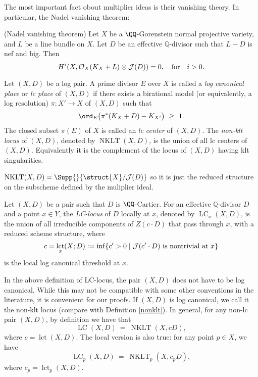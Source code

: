 \documentclass[12pt]{article}
\theoremstyle{plain}
\DeclareMathOperator{\NKLT}{NKLT}
\DeclareMathOperator{\LC}{LC}
\DeclareMathOperator{\lct}{lct}
\newcommand{\mb}[1]{\mathbb{#1}}
\begin{document}
The most important fact obout multiplier ideas is their vanishing theory. In particular, the Nadel vanishing theorem:

\begin{theorem}\label{nadel} \textup{(Nadel vanishing theorem)}
Let $X$ be a $\QQ$-Gorenstein normal projective variety, and $L$ be a line bundle on $X$. Let $D$ be an effective $\mb{Q}$-divisor such that $L-D$ is nef and big. Then
\[ H^i(X,\mathcal{O}_X(K_X+L)\otimes \mathcal{J}(D))=0,\quad \textup{for}\quad i>0. \]
\end{theorem}

\begin{defn}\label{nonklt}\textup{
    Let $(X,D)$ be a log pair. A prime divisor $E$ over $X$ is called a \emph{log canonical place} or \textit{lc place} of $(X,D)$ if there exists a birational model (or equivalently, a log resolution) $\pi:X'\rightarrow X$ of $(X,D)$ such that
    \[ \ord_{E}\big(\pi^{*}(K_X+D)-K_{X'}\big)\ \ge \ 1. \]
The closed subset $\pi(E)$ of $X$ is called an \emph{lc center} of $(X,D)$. The \emph{non-klt locus} of $(X,D)$, denoted by $\NKLT(X,D)$, is the union of all lc centers of $(X,D)$. Equivalently it is the complement of the locus of $(X, D)$ having klt singularities.
}\end{defn}

\begin{rmk}
$\NKLT(X,D) = \Supp{}{\struct{X} / \mtc{J}(D)}$ so it is just the reduced structure on the subscheme defined by the muliplier ideal.
\end{rmk}

\begin{defn}
Let $(X, D)$ be a pair such that $D$ is $\QQ$-Cartier. For an effective $\mb{Q}$-divisor $D$ and a point $x\in Y$, the \emph{LC-locus} of $D$ locally at $x$, denoted by $\LC_x(X,D)$, is the union of all irreducible components of $Z(c\cdot D)$ that pass through $x$, with a reduced scheme structure, where
\[ c = \lct_x(X;D) := \inf \{ c' > 0 \mid \mtc{J}(c' \cdot D) \text{ is nontrivial at } x \} \]
is the local log canonical threshold at $x$.
\end{defn}

\begin{remark}
    \textup{In the above definition of LC-locus, the pair $(X,D)$ does not have to be log canonical. While this may not be compatible with some other conventions in the literature, it is convenient for our proofs. If $(X,D)$ is log canonical, we call it the non-klt locus (compare with Definition \ref{nonklt}). In general, for any non-lc pair $(X,D)$, by definition we have that
    \[ \LC(X,D)\ =\ \NKLT(X,cD), \]
    where $c=\lct(X,D)$. The local version is also true: for any point $p\in X$, we have $$\LC_p(X,D)\ =\ \NKLT_p(X,c_pD),$$ where $c_p=\lct_p(X,D)$. }
\end{remark}
\end{document}
